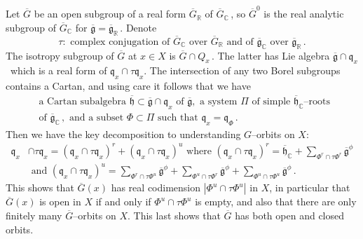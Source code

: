 \documentclass{conm-p-l}
\renewcommand{\gg}{\mathfrak{g}}
\newcommand{\gq}{\mathfrak{q}}
\def\gg{\mathfrak{g}}
\def\gh{\mathfrak{h}}
\def\gq{\mathfrak{q}}
\def\C{\mathbb{C}}
\def\R{\mathbb{R}}
\begin{document}
\subsection{}\label{ssec6b}\setcounter{equation}{0}
Let $\overline{G}$ be an open subgroup of a real form $\overline{G}_\R$
of $\overline{G}_\C$\,, so $\overline{G}^0$ is the real analytic subgroup
of $\overline{G}_\C$ for $\overline{\gg} = \overline{\gg}_\R$\,.  Denote
\begin{equation}\label{6.2.1}
\tau: \text{ complex conjugation of } \overline{G}_\C  \text{ over } 
	\overline{G}_\R \text{ and of } \overline{\gg}_\C  \text{ over }
	\overline{\gg}_\R\,.
\end{equation}
The isotropy subgroup of $\overline{G}$ at $x \in X$ is 
$\overline{G}\cap Q_x$\,.  The latter has Lie algebra 
$\overline{\gg}\cap \gq_x$\, which is a real form of $\gq_x \cap \tau\gq_x$.
The intersection of any two Borel subgroups contains a Cartan, and using
care it follows that we have
\begin{equation}\label{6.2.3}
\begin{aligned}
&\text{a Cartan subalgebra } \overline{\gh} \subset \overline{\gg}\cap \gq_x
	\text{ of } \overline{\gg}, \text{ a system } \Pi
	\text{ of simple } \overline{\gh}_\C\text{--roots }\\
&\text{of } \overline{\gg}_\C\,, \text{ and a subset } \Phi \subset \Pi
	\text{ such that } \gq_x = \gq_\Phi\,.
\end{aligned}
\end{equation}
Then we have the key decomposition to understanding $G$--orbits on $X$:
\begin{equation}\label{6.2.4}
\begin{aligned}
\gq_x &\cap \tau\gq_x = (\gq_x \cap \tau\gq_x)^r +
	(\gq_x \cap \tau\gq_x)^u \text{ where }
	(\gq_x \cap \tau\gq_x)^r = \overline{\gh}_\C + 
	\sum_{\Phi^r \cap \tau\Phi^r} \overline{\gg}^\phi \\
&\text{ and } (\gq_x \cap \tau\gq_x)^u = 
	\sum_{\Phi^r \cap \tau\Phi^u} \overline{\gg}^\phi +
	\sum_{\Phi^u \cap \tau\Phi^r} \overline{\gg}^\phi +
	\sum_{\Phi^u \cap \tau\Phi^u} \overline{\gg}^\phi \,.
\end{aligned}
\end{equation}
This shows that $\overline{G}(x)$ has real codimension
$|\Phi^u \cap \tau\Phi^u|$ in $X$, in particular that $\overline{G}(x)$
is open in $X$ if and only if $\Phi^u \cap \tau\Phi^u$ is empty, and
also that there are only finitely many $\overline{G}$--orbits on $X$.
This last shows that $\overline{G}$ has both open and closed 
orbits.
\end{document}
